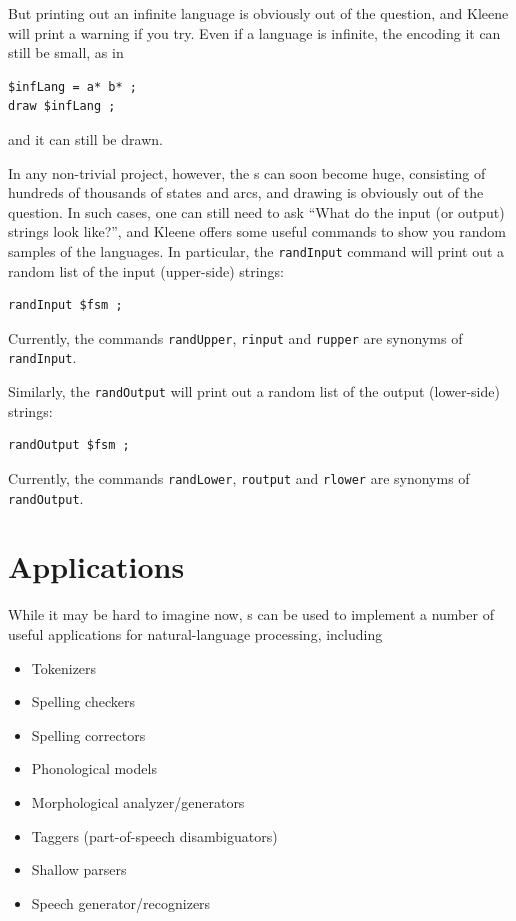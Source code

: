 \noindent
But printing out an infinite language is obviously out of the question, and Kleene will print
a warning if you try.  Even if a language
is infinite, the \fsm{} encoding it can still be small, as in

\begin{Verbatim}
$infLang = a* b* ;
draw $infLang ;
\end{Verbatim}

\noindent
and it can still be drawn.

In any non-trivial project, however, the \fsm{}s can soon become huge, consisting of hundreds of
thousands of states and arcs, and drawing is obviously out of the question.  In such cases,
one can still need to ask ``What do the input (or output) strings look like?'', and Kleene
offers some useful commands to show you random samples of the languages.  
In particular, the \texttt{randInput} command will print out
a random list of the input (upper-side) strings:

\begin{Verbatim}
randInput $fsm ;
\end{Verbatim}

\noindent
Currently, the commands \texttt{randUpper}, \texttt{rinput} and
\texttt{rupper} are synonyms of \texttt{randInput}.


Similarly, the \texttt{randOutput} will print out a random list of the output (lower-side) strings:

\begin{Verbatim}
randOutput $fsm ;
\end{Verbatim}

\noindent
Currently, the commands \texttt{randLower}, \texttt{routput} and
\texttt{rlower} are synonyms of \texttt{randOutput}.

\section{Applications}

While it may be hard to imagine now, \fsm{}s can be used to implement a number of useful
applications for natural-language processing, including

\begin{itemize}
\item
Tokenizers
\item
Spelling checkers
\item
Spelling correctors
\item
Phonological models
\item
Morphological analyzer/generators
\item
Taggers (part-of-speech disambiguators)
\item
Shallow parsers
\item
Speech generator/recognizers
\end{itemize}

